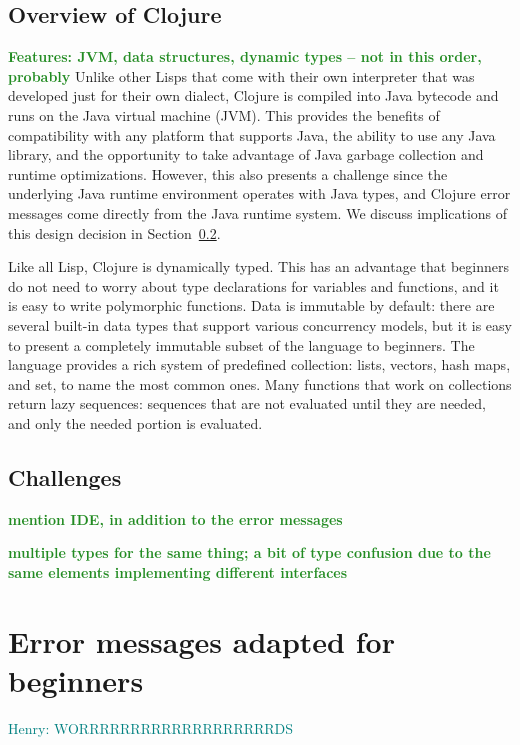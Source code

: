 \documentclass[submission,copyright,creativecommons]{eptcs}
\newcommand{\allcomments}[1]{{#1}}
\newcommand{\emcomment}[1]{{\bf \textcolor{ForestGreen}{\allcomments{{#1}}}}}
\newcommand{\hfcomment}[1]{\textcolor{Teal}{\allcomments{Henry: {#1}}}}
\begin{document}
\subsection{Overview of Clojure}\label{subsec:clojure}

\emcomment{Features: JVM, data structures, dynamic types -- not in this order, probably}
Unlike other Lisps that come with their own interpreter that was developed just for their own dialect, Clojure is compiled 
into Java bytecode and runs on the Java virtual machine (JVM). This provides the benefits of compatibility with 
any platform that supports Java, the ability to use any Java library, and the opportunity to take advantage of Java 
garbage collection and runtime optimizations. However, this also presents a challenge since the underlying Java 
runtime environment operates with Java types, and Clojure error messages come directly from the Java runtime
system. We discuss implications of this design decision in Section~\ref{subsec:challenges}.

Like all Lisp, Clojure is dynamically typed. This has an advantage that beginners do not need to worry about type declarations
for variables and functions, and it is easy to write polymorphic functions. 
Data is immutable by default: there are several built-in data types that support various concurrency models, 
but it is easy to present a completely immutable subset of the language to beginners. 
The language provides a rich system of predefined collection: lists, vectors, hash maps, and set, to name the 
most common ones. Many functions that work on collections return lazy sequences: sequences that are not evaluated 
until they are needed, and only the needed portion is evaluated. 
 

\subsection{Challenges}\label{subsec:challenges}

\emcomment{mention IDE, in addition to the error messages}

\emcomment{multiple types for the same thing; a bit of type confusion due to the same elements implementing different interfaces}

\section{Error messages adapted for beginners}\label{sec:errors-work}
\hfcomment{WORRRRRRRRRRRRRRRRRRRDS}
\end{document}
